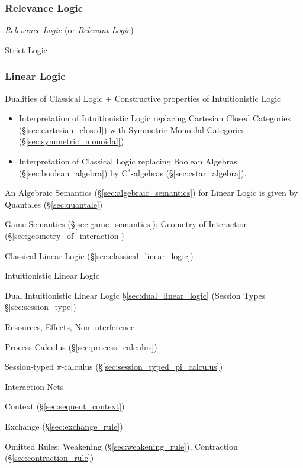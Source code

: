 \subsubsection{Relevance Logic}\label{sec:relevance_logic}

\emph{Relevance Logic} (or \emph{Relevant Logic})

Strict Logic



\subsubsection{Linear Logic}\label{sec:linear_logic}

Dualities of Classical Logic + Constructive properties of
Intuitionistic Logic

\begin{itemize}
\item Interpretation of Intuitionistic Logic replacing Cartesian Closed
  Categories (\S\ref{sec:cartesian_closed}) with Symmetric Monoidal
  Categories (\S\ref{sec:symmetric_monoidal})
\item Interpretation of Classical Logic replacing Boolean Algebras
  (\S\ref{sec:boolean_algebra}) by C$^*$-algebras
  (\S\ref{sec:cstar_algebra}).
\end{itemize}

An Algebraic Semantics (\S\ref{sec:algebraic_semantics}) for Linear
Logic is given by Quantales (\S\ref{sec:quantale})

Game Semantics (\S\ref{sec:game_semantics}): Geometry of Interaction
(\S\ref{sec:geometry_of_interaction})

Classical Linear Logic (\S\ref{sec:classical_linear_logic})

Intuitionistic Linear Logic

Dual Intuitionistic Linear Logic \S\ref{sec:dual_linear_logic}
(Session Types \S\ref{sec:session_type}) \cite{caires-pfenning10}

Resources, Effects, Non-interference \cite{caires-pfenning10}

Process Calculus (\S\ref{sec:process_calculus})

Session-typed $\pi$-calculus (\S\ref{sec:session_typed_pi_calculus})

Interaction Nets %

Context (\S\ref{sec:sequent_context})

Exchange (\S\ref{sec:exchange_rule})

Omitted Rules: Weakening (\S\ref{sec:weakening_rule}), Contraction
(\S\ref{sec:contraction_rule})


